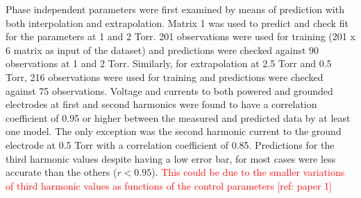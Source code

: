 \documentclass[12pt]{iopart}
\begin{document}
Phase independent parameters were first examined by means of prediction with both interpolation and extrapolation. Matrix 1 was used to predict and check fit for the parameters at 1 and 2 Torr. 201 observations were used for training (201 x 6 matrix as input of the dataset) and predictions were checked against 90 observations at 1 and 2 Torr. Similarly, for extrapolation at 2.5 Torr and 0.5 Torr, 216 observations were used for training and predictions were checked against 75 observations. Voltage and currents to both powered and grounded electrodes at first and second harmonics were found to have a correlation coefficient of 0.95 or higher between the measured and predicted data by at least one model. The only exception was the second harmonic current to the ground electrode at 0.5 Torr with a correlation coefficient of 0.85. Predictions for the third harmonic values despite having a low error bar, for most cases were less accurate than the others ($r<0.95$). \textcolor{red}{This could be due to the smaller variations of third harmonic values as functions of the control parameters [ref: paper 1]}

\end{document}
